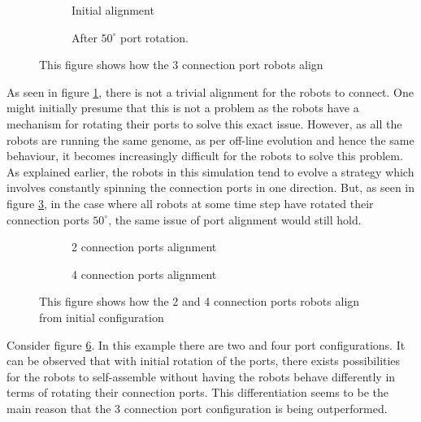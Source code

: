 \begin{figure}[H]
	\begin{subfigure}[t]{0.49\textwidth}
		\centering
		\caption{Initial alignment}
		\label{3-port-guided-allignment}
	\end{subfigure}
	\begin{subfigure}[t]{0.49\textwidth}
		\centering
		\caption{After $50^{\circ}$ port rotation.}
		\label{3-port-guided-allignment-offset}
	\end{subfigure}
	\caption{This figure shows how the 3 connection port robots align}
\end{figure}


As seen in figure \ref{3-port-guided-allignment}, there is not a trivial alignment for the robots to connect.
One might initially presume that this is not a problem as the robots have a mechanism for rotating their ports to solve this exact issue.
However, as all the robots are running the same genome, as per off-line evolution and hence the same behaviour, it becomes increasingly difficult for the robots to solve this problem.
As explained earlier, the robots in this simulation tend to evolve a strategy which involves constantly spinning the connection ports in one direction.
But, as seen in figure \ref{3-port-guided-allignment-offset}, in the case where all robots at some time step have rotated their connection ports $50^{\circ}$, the same issue of port alignment would still hold.

\begin{figure}[H]
	\begin{subfigure}[t]{0.49\textwidth}
		\centering
		\caption{2 connection ports alignment}
		\label{2-port-guided-allignment}
	\end{subfigure}
	\begin{subfigure}[t]{0.49\textwidth}
		\centering
		\caption{4 connection ports alignment}
		\label{4-port-guided-allignment}
	\end{subfigure}
	\caption{This figure shows how the 2 and 4 connection ports robots align from initial configuration}
	\label{2-4-port-guided-allignment}
\end{figure}

Consider figure \ref{2-4-port-guided-allignment}.
In this example there are two and four port configurations.
It can be observed that with initial rotation of the ports, there exists possibilities for the robots to self-assemble without having the robots behave differently in terms of rotating their connection ports.
This differentiation seems to be the main reason that the 3 connection port configuration is being outperformed.

